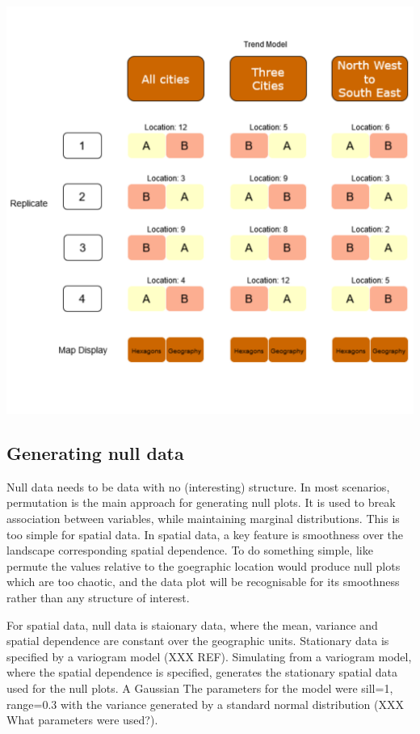 \documentclass[conference,final,]{IEEEtran}
\makeatletter
\def\maxwidth{\ifdim\Gin@nat@width>\linewidth\linewidth
\else\Gin@nat@width\fi}
\let\Oldincludegraphics\includegraphics
\renewcommand{\includegraphics}[1]{\Oldincludegraphics[width=\maxwidth]{#1}}
\makeatother
\begin{document}
\includegraphics{paper_files/figure-latex/exp-design-1.pdf}

\hypertarget{generating-null-data}{%
\subsection{Generating null data}\label{generating-null-data}}

Null data needs to be data with no (interesting) structure. In most scenarios, permutation is the main approach for generating null plots. It is used to break association between variables, while maintaining marginal distributions. This is too simple for spatial data. In spatial data, a key feature is smoothness over the landscape corresponding spatial dependence. To do something simple, like permute the values relative to the goegraphic location would produce null plots which are too chaotic, and the data plot will be recognisable for its smoothness rather than any structure of interest.

For spatial data, null data is staionary data, where the mean, variance and spatial dependence are constant over the geographic units. Stationary data is specified by a variogram model (XXX REF). Simulating from a variogram model, where the spatial dependence is specified, generates the stationary spatial data used for the null plots. A Gaussian The parameters for the model were sill=1, range=0.3 with the variance generated by a standard normal distribution (XXX What parameters were used?).
\end{document}
